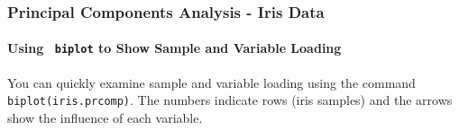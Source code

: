 \documentclass[10pt]{beamer}
\begin{document}
\begin{frame}[fragile]
\frametitle{Principal Components Analysis - Iris Data}
\framesubtitle{Using {\tt \color{red} biplot} to Show Sample and Variable Loading}

\begin{center}
\end{center}

{\scriptsize You can quickly examine sample and variable loading using the
  command {\color{red} \tt biplot(iris.prcomp)}.  The numbers
  indicate rows (iris samples) and the arrows show the 
  influence of each variable.\\}
\end{frame}
\end{document}

